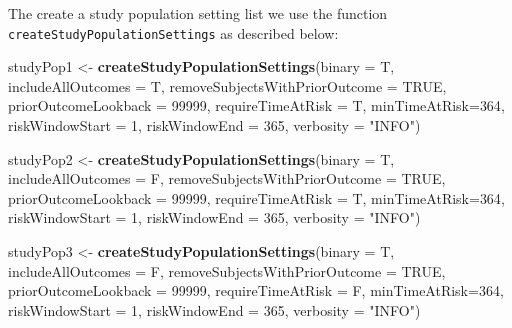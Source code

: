 \documentclass[]{article}
\newenvironment{Shaded}{\begin{snugshade}}{\end{snugshade}}
\newcommand{\KeywordTok}[1]{\textcolor[rgb]{0.13,0.29,0.53}{\textbf{#1}}}
\newcommand{\DataTypeTok}[1]{\textcolor[rgb]{0.13,0.29,0.53}{#1}}
\newcommand{\DecValTok}[1]{\textcolor[rgb]{0.00,0.00,0.81}{#1}}
\newcommand{\StringTok}[1]{\textcolor[rgb]{0.31,0.60,0.02}{#1}}
\newcommand{\OtherTok}[1]{\textcolor[rgb]{0.56,0.35,0.01}{#1}}
\newcommand{\NormalTok}[1]{#1}
\begin{document}
The create a study population setting list we use the function
\texttt{createStudyPopulationSettings} as described below:

\begin{Shaded}
\begin{Highlighting}[]
\NormalTok{studyPop1 <-}\StringTok{ }\KeywordTok{createStudyPopulationSettings}\NormalTok{(}\DataTypeTok{binary =}\NormalTok{ T,}
                                          \DataTypeTok{includeAllOutcomes =}\NormalTok{ T,}
                                          \DataTypeTok{removeSubjectsWithPriorOutcome =} \OtherTok{TRUE}\NormalTok{,}
                                          \DataTypeTok{priorOutcomeLookback =} \DecValTok{99999}\NormalTok{,}
                                          \DataTypeTok{requireTimeAtRisk =}\NormalTok{ T,}
                                          \DataTypeTok{minTimeAtRisk=}\DecValTok{364}\NormalTok{,}
                                          \DataTypeTok{riskWindowStart =} \DecValTok{1}\NormalTok{,}
                                          \DataTypeTok{riskWindowEnd =} \DecValTok{365}\NormalTok{,}
                                          \DataTypeTok{verbosity =} \StringTok{"INFO"}\NormalTok{)}

\NormalTok{studyPop2 <-}\StringTok{ }\KeywordTok{createStudyPopulationSettings}\NormalTok{(}\DataTypeTok{binary =}\NormalTok{ T,}
                                           \DataTypeTok{includeAllOutcomes =}\NormalTok{ F,}
                                           \DataTypeTok{removeSubjectsWithPriorOutcome =} \OtherTok{TRUE}\NormalTok{,}
                                           \DataTypeTok{priorOutcomeLookback =} \DecValTok{99999}\NormalTok{,}
                                           \DataTypeTok{requireTimeAtRisk =}\NormalTok{ T,}
                                           \DataTypeTok{minTimeAtRisk=}\DecValTok{364}\NormalTok{,}
                                           \DataTypeTok{riskWindowStart =} \DecValTok{1}\NormalTok{,}
                                           \DataTypeTok{riskWindowEnd =} \DecValTok{365}\NormalTok{,}
                                           \DataTypeTok{verbosity =} \StringTok{"INFO"}\NormalTok{)}

\NormalTok{studyPop3 <-}\StringTok{ }\KeywordTok{createStudyPopulationSettings}\NormalTok{(}\DataTypeTok{binary =}\NormalTok{ T,}
                                           \DataTypeTok{includeAllOutcomes =}\NormalTok{ F,}
                                           \DataTypeTok{removeSubjectsWithPriorOutcome =} \OtherTok{TRUE}\NormalTok{,}
                                           \DataTypeTok{priorOutcomeLookback =} \DecValTok{99999}\NormalTok{,}
                                           \DataTypeTok{requireTimeAtRisk =}\NormalTok{ F,}
                                           \DataTypeTok{minTimeAtRisk=}\DecValTok{364}\NormalTok{,}
                                           \DataTypeTok{riskWindowStart =} \DecValTok{1}\NormalTok{,}
                                           \DataTypeTok{riskWindowEnd =} \DecValTok{365}\NormalTok{,}
                                           \DataTypeTok{verbosity =} \StringTok{"INFO"}\NormalTok{)}
                                           

\end{Highlighting}
\end{Shaded}
\end{document}

